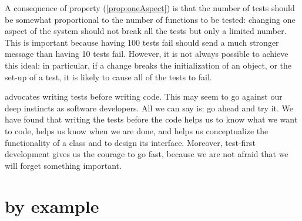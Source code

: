\documentclass[a4paper,10pt,twoside]{book}
\begin{document}
A consequence of property (\ref{prop:oneAspect}) is that 
the number of tests should be somewhat proportional to the number of
functions to be tested: changing one aspect of the
system should not break all the tests but only a limited
number.  This is important because having 100 tests fail should send a
much stronger message than having 10 tests fail.
However, it is not always possible to achieve this ideal: 
in particular, if a change breaks the initialization of an object, or the
set-up of a test, it is likely to cause all of the tests to fail. 

 advocates writing tests before writing code.  This may seem to go
against our deep instincts as software developers.  
All we can say is: go ahead and try it.
We have found that writing the tests before the code helps us
to know what we want to code, helps us know when we are done,
and helps us conceptualize the functionality of a class and to
design its interface.
Moreover, test-first development gives us the courage to go fast, because we are not afraid that we will forget something important.  





\section{\sunit by example}
\end{document}
